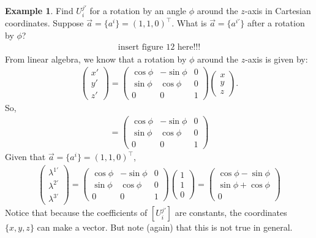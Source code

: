 \documentclass{article}
\theoremstyle{definition}
\newtheorem{exmp}{Example}[section]
\begin{document}
\begin{exmp}
	Find $U^{j'}_i$ for a rotation by an angle $\phi$ around the $z$-axis in Cartesian coordinates. Suppose $\vec{a} = \{a^i \}= (1,1,0)^\top$. What is $\vec{a} = \{ a^{i'}\}$ after a rotation by $\phi$?
	\begin{align*}
	\text{insert figure 12 here!!!}
	\end{align*}
	From linear algebra, we know that a rotation by $\phi$ around the $z$-axis is given by:
	\begin{align*}
	\begin{pmatrix}
	x'\\y'\\z'
	\end{pmatrix}
	=
	\begin{pmatrix}
	\cos\phi & -\sin\phi & 0\\
	\sin\phi & \cos\phi & 0 \\
	0 & 0 & 1
	\end{pmatrix}
	\begin{pmatrix}
	x\\y\\z
	\end{pmatrix}.
	\end{align*}
	So,
	\begin{align*}
	[U^{j'}_i] = 
	\begin{pmatrix}
	\cos\phi & -\sin\phi & 0\\
	\sin\phi & \cos\phi & 0 \\
	0 & 0 & 1
	\end{pmatrix}
	\end{align*}
	Given that $\vec{a} = \{a^i \}= (1,1,0)^\top$, 
	\begin{align*}
	\begin{pmatrix}
	\lambda^{1'}\\\lambda^{2'}\\\lambda^{3'}
	\end{pmatrix}
	=
	\begin{pmatrix}
	\cos\phi & -\sin\phi & 0\\
	\sin\phi & \cos\phi & 0 \\
	0 & 0 & 1
	\end{pmatrix}
	\begin{pmatrix}
	1\\1\\0
	\end{pmatrix}
	=
	\begin{pmatrix}
		\cos\phi - \sin\phi\\
		\sin\phi + \cos\phi\\
		0
	\end{pmatrix}
	\end{align*}
	Notice that because the coefficients of $[U^{j'}_i]$ are constants, the coordinates $\{ x,y,z\}$ can make a vector. But note (again) that this is not true in general.\\
	

\end{exmp}
\end{document}
